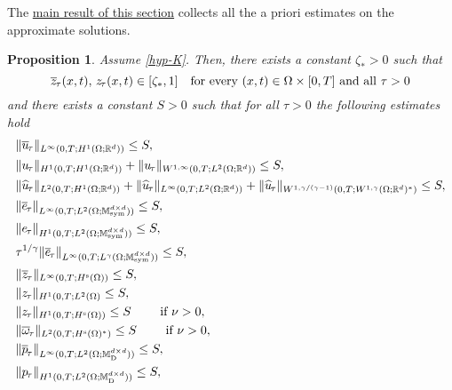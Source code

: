 \documentclass[a4paper,10pt,reqno]{amsart}
\numberwithin{equation}{section}
\newcommand{\bbM}{\mathbb{M}}
\newcommand{\R}{\mathbb{R}}
\numberwithin{equation}{section}
\newtheorem{proposition}[theorem]{Proposition}
\newcommand{\down}{\downarrow}
\newcommand{\piecewiseConstant}[2]{\overline{#1}_{\kern-1pt#2}}
\newcommand{\pwc}{\piecewiseConstant}
\newcommand{\piecewiseLinear}[2]{{#1}_{\kern-1pt#2}}
\newcommand{\pwl}{\piecewiseLinear}
\newcommand{\pwwll}[2]{\widehat{#1}_{\kern-1pt#2}}
\newcommand{\mt}{\bbM}
\newcommand{\sym}{\mathrm{sym}}
\newcommand{\dev}{\mathrm{D}}
\newcommand{\uu}{u}
\newcommand{\spz}{H^{\mathrm{s}}(\Omega)}
\newcommand{\EEE}{\color{black}}
\begin{document}
\par
The \underline{main result of this section} collects  all the a priori estimates on the approximate solutions. 
\begin{proposition}
\label{prop:aprio} 
Assume \eqref{hyp-K}. Then, there exists a constant $\zeta_*>0$ such that 
\begin{equation}
\label{discr-feasibility}
\pwc z\tau(x,t), \, \pwl z \tau(x,t) \in [\zeta_*, 1] \quad \text{for every } (x,t) \in \Omega \times [0,T] \text{ and all } \tau>0
\end{equation}
and 
 there exists a constant $S>0$ such that for all $\tau>0$ the following estimates hold
\begin{subequations}
\label{aprio}
\begin{align}
& \label{aprioU1}
\|\pwc \uu{\tau}\|_{L^\infty(0,T;H^1(\Omega;\R^d))}
 \leq S,
\\
& \label{aprioU2}
\|\pwl \uu{\tau}\|_{H^1(0,T; H^1(\Omega;\R^d) )} + \|\pwl \uu{\tau}\|_{
W^{1,\infty}(0,T; L^2(\Omega;\R^d))}
 \leq S,
\\
& \label{aprioU3} \|\pwwll \uu{\tau}
\|_{L^2(0,T; H^1(\Omega;\R^d) )} +   \|\pwwll \uu{\tau}
\|_{L^\infty (0,T;  L^2(\Omega;\R^d))} + \|\pwwll \uu{\tau}
\|_{W^{1,\gamma/(\gamma-1)}(0,T;W^{1,\gamma}(\Omega;\R^d)^*)} \leq S,
\\
& \label{aprioE1}
\|\pwc
e{\tau}\|_{L^\infty(0,T;L^2(\Omega;\mt_\sym^{d\times d}))} \leq S,
\\
& \label{aprioE2}
\|\pwl
e{\tau}\|_{H^1(0,T;L^2(\Omega;\mt_\sym^{d\times d}))} \leq S,
\\
& \label{aprioE3}
\tau^{1/\gamma}\|\pwc
e{\tau}\|_{L^\infty(0,T;L^\gamma(\Omega;\mt_\sym^{d\times d}))} \leq S,
\\
& 
\label{aprioZ1}
\| \pwc z\tau\|_{L^\infty (0,T;\spz)} \leq S,
\\
&
\label{aprioZ2}
\| \pwl z\tau\|_{H^1(0,T;L^2(\Omega)} \leq S,
\\
& \label{aprioZ3}
\| \pwl z\tau\|_{H^1(0,T;\spz)} \leq S \qquad \text{ if } \nu>0,
\\
& \label{aprioZ4}
\| \pwc \omega \tau\|_{L^2(0,T;\spz^*)} \leq S  \qquad \text{ if } \nu>0,
\\
& \label{aprioP1}
\|\pwc
p{\tau}\|_{L^\infty(0,T;L^2(\Omega;\mt_\dev^{d\times d}))} \leq S,
\\
& \label{aprioP2}
\|\pwl
p{\tau}\|_{H^1(0,T;L^2(\Omega;\mt_\dev^{d\times d}))} \leq S,

\end{align}
\end{subequations}
\end{proposition}
\end{document}
